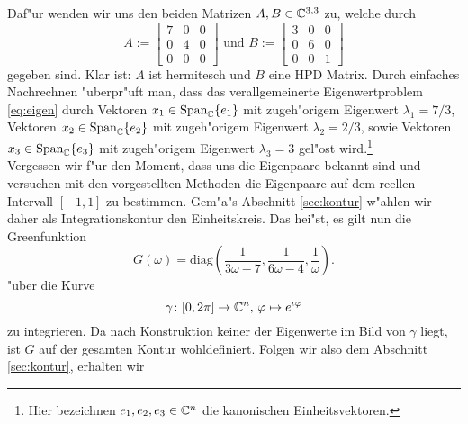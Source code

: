 Daf"ur wenden wir uns den beiden Matrizen
$A,B \in \mathbb{C}^{3,3}$ zu, welche durch
\[
A:= \begin{bmatrix} 7 & 0 & 0 \\ 0 & 4 & 0 \\ 0 & 0 & 0 \end{bmatrix} \text{ und }
B:= \begin{bmatrix} 3 & 0 & 0\\ 0 & 6 & 0 \\ 0 & 0 & 1 \end{bmatrix}
\]
gegeben sind. Klar ist: $A$ ist hermitesch und $B$ eine HPD Matrix.
Durch einfaches Nachrechnen "uberpr"uft man, dass das
verallgemeinerte Eigenwertproblem \eqref{eq:eigen} durch Vektoren
$x_1 \in \text{Span}_{\mathbb{C}}\{e_1\}$ mit zugeh"origem Eigenwert $\lambda_1 = 7/3$, Vektoren
$x_2 \in \text{Span}_{\mathbb{C}}\{e_2\}$ mit zugeh"origem Eigenwert $\lambda_2 = 2/3$, sowie
Vektoren $x_3 \in\text{Span}_{\mathbb{C}}\{e_3\}$ mit zugeh"origem Eigenwert $\lambda_3 = 3$
gel"ost wird.\footnote{Hier bezeichnen $e_1, e_2, e_3 \in\mathbb{C}^n$ die kanonischen Einheitsvektoren.}\\

Vergessen wir f"ur den Moment, dass uns die Eigenpaare bekannt sind und versuchen
mit den vorgestellten Methoden die Eigenpaare auf dem reellen Intervall $[-1,1]$ zu bestimmen.
Gem"a"s Abschnitt \ref{sec:kontur} w"ahlen wir daher als Integrationskontur den Einheitskreis.
Das hei"st, es gilt nun die Greenfunktion
\[
G(\omega) = \text{diag}\left(\frac{1}{3\omega - 7}, \frac{1}{6\omega - 4}, \frac{1}{\omega}\right).
\]
"uber die Kurve
\begin{equation}\label{kurve}
\gamma\colon [0,2\pi]\to\mathbb{C}^n\text{, }\varphi\mapsto e^{\iota \varphi}
\end{equation}
zu integrieren. Da nach Konstruktion keiner der Eigenwerte im Bild von
$\gamma$ liegt, ist $G$ auf der gesamten Kontur wohldefiniert.
Folgen wir also dem Abschnitt \ref{sec:kontur}, erhalten wir

